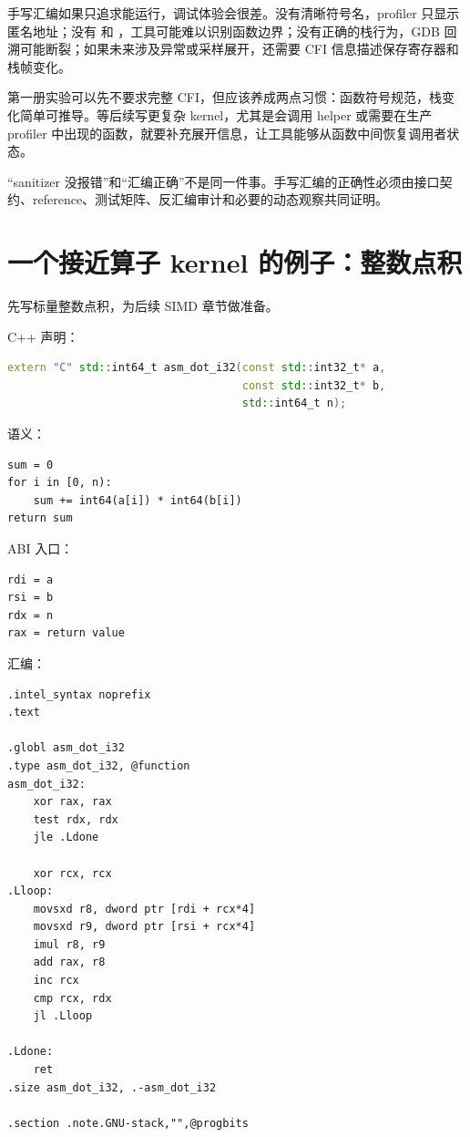 手写汇编如果只追求能运行，调试体验会很差。没有清晰符号名，profiler 只显示匿名地址；没有  和 ，工具可能难以识别函数边界；没有正确的栈行为，GDB 回溯可能断裂；如果未来涉及异常或采样展开，还需要 CFI 信息描述保存寄存器和栈帧变化。

第一册实验可以先不要求完整 CFI，但应该养成两点习惯：函数符号规范，栈变化简单可推导。等后续写更复杂 kernel，尤其是会调用 helper 或需要在生产 profiler 中出现的函数，就要补充展开信息，让工具能够从函数中间恢复调用者状态。

\begin{warningbox}
“sanitizer 没报错”和“汇编正确”不是同一件事。手写汇编的正确性必须由接口契约、reference、测试矩阵、反汇编审计和必要的动态观察共同证明。
\end{warningbox}

\section{一个接近算子 kernel 的例子：整数点积}

先写标量整数点积，为后续 SIMD 章节做准备。

C++ 声明：

\begin{lstlisting}[language=C++]
extern "C" std::int64_t asm_dot_i32(const std::int32_t* a,
                                    const std::int32_t* b,
                                    std::int64_t n);
\end{lstlisting}

语义：

\begin{lstlisting}
sum = 0
for i in [0, n):
    sum += int64(a[i]) * int64(b[i])
return sum
\end{lstlisting}

ABI 入口：

\begin{lstlisting}
rdi = a
rsi = b
rdx = n
rax = return value
\end{lstlisting}

汇编：

\begin{lstlisting}
.intel_syntax noprefix
.text

.globl asm_dot_i32
.type asm_dot_i32, @function
asm_dot_i32:
    xor rax, rax
    test rdx, rdx
    jle .Ldone

    xor rcx, rcx
.Lloop:
    movsxd r8, dword ptr [rdi + rcx*4]
    movsxd r9, dword ptr [rsi + rcx*4]
    imul r8, r9
    add rax, r8
    inc rcx
    cmp rcx, rdx
    jl .Lloop

.Ldone:
    ret
.size asm_dot_i32, .-asm_dot_i32

.section .note.GNU-stack,"",@progbits
\end{lstlisting}

